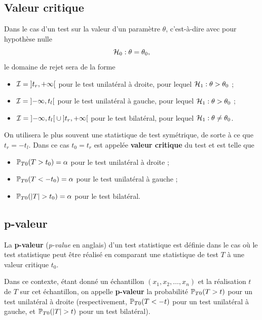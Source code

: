\subsection{Valeur critique}
Dans le cas d'un test sur la valeur d'un paramètre $\theta$, c'est-à-dire avec
pour hypothèse nulle 
\[
  \mathcal{H}_0: \theta = \theta_0,
\]
le domaine de rejet sera de la forme
\begin{itemize}
\item $\mathcal{I} = \mathopen]t_r, +\infty \mathclose[$ pour le test unilatéral à
  droite, pour lequel $\mathcal{H}_1 : \theta > \theta_0$ ;
\item $\mathcal{I} = \mathopen]-\infty, t_l \mathclose[$ pour le test unilatéral à
  gauche, pour lequel $\mathcal{H}_1 : \theta > \theta_0$ ;
\item
  $\mathcal{I} = \mathopen]-\infty, t_l \mathclose[ \cup \mathopen]t_r, +\infty
  \mathclose[$
  pour le test bilatéral, pour lequel $\mathcal{H}_1 : \theta \neq \theta_0$.
\end{itemize}

On utilisera le plus souvent une statistique de test symétrique, de sorte à
ce que $t_r = - t_l$.  Dans ce cas $t_0 = t_r$ est appelée
\textbf{valeur critique} du test et est telle que
\begin{itemize}
\item $\mathbb{P}_{T0}(T > t_0) = \alpha$ pour le test unilatéral à droite ; 
\item $\mathbb{P}_{T0}(T < - t_0) = \alpha$ pour le test unilatéral à gauche ; 
\item $\mathbb{P}_{T0}(|T| > t_0) = \alpha$ pour le test bilatéral. 
\end{itemize}

\subsection{p-valeur}
La \textbf{p-valeur} (\textit{p-value} en anglais) d'un test statistique est
définie dans le cas où le test statistique peut être réalisé en comparant une
statistique de test $T$%
à
une valeur critique $t_0$.

Dans ce contexte, étant donné un échantillon $(x_1, x_2, \dots, x_n)$ et la
réalisation $t$ de $T$ sur cet échantillon, on appelle \textbf{p-valeur} la
probabilité $\mathbb{P}_{T0}(T > t)$ pour un test unilatéral à droite (respectivement,
$\mathbb{P}_{T0}(T < -t)$ pour un test unilatéral à gauche, et $\mathbb{P}_{T0}(\lvert T\rvert > t)$
pour un test bilatéral). 

